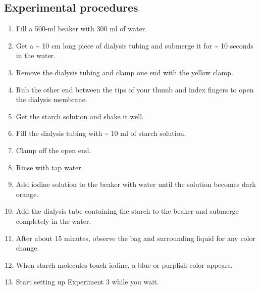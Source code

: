 \documentclass[]{book}
\providecommand{\tightlist}{%
  \setlength{\itemsep}{0pt}\setlength{\parskip}{0pt}}
\theoremstyle{definition}
\theoremstyle{definition}
\theoremstyle{definition}
\theoremstyle{remark}
\begin{document}
\subsection{Experimental procedures}\label{experimental-procedures-16}

\begin{enumerate}
\def\labelenumi{\arabic{enumi}.}
\tightlist
\item
  Fill a 500-ml beaker with 300 ml of water.
\item
  Get a \textasciitilde{} 10 cm long piece of dialysis tubing and
  submerge it for \textasciitilde{} 10 seconds in the water.
\item
  Remove the dialysis tubing and clamp one end with the yellow clamp.
\item
  Rub the other end between the tips of your thumb and index fingers to
  open the dialysis membrane.
\item
  Get the starch solution and shake it well.
\item
  Fill the dialysis tubing with \textasciitilde{} 10 ml of starch
  solution.
\item
  Clamp off the open end.
\item
  Rinse with tap water.
\item
  Add iodine solution to the beaker with water until the solution
  becomes dark orange.
\item
  Add the dialysis tube containing the starch to the beaker and submerge
  completely in the water.
\item
  After about 15 minutes, observe the bag and surrounding liquid for any
  color change.
\item
  When starch molecules touch iodine, a blue or purplish color appears.
\item
  Start setting up Experiment 3 while you wait.
\end{enumerate}
\end{document}
